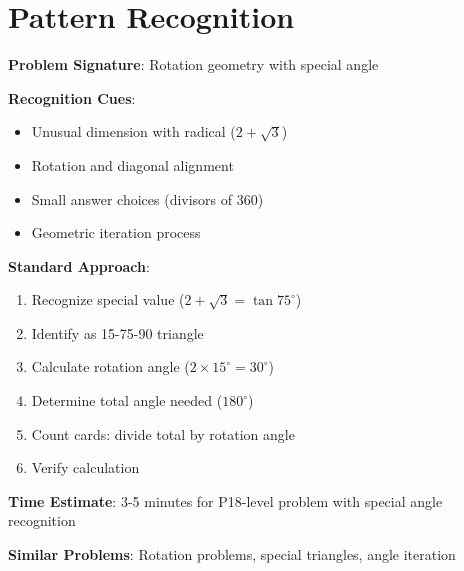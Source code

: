 \documentclass[12pt]{article}
\begin{document}
\section*{Pattern Recognition}

\textbf{Problem Signature}: Rotation geometry with special angle

\textbf{Recognition Cues}:
\begin{itemize}
    \item Unusual dimension with radical ($2+\sqrt{3}$)
    \item Rotation and diagonal alignment
    \item Small answer choices (divisors of 360)
    \item Geometric iteration process
\end{itemize}

\textbf{Standard Approach}:
\begin{enumerate}
    \item Recognize special value ($2+\sqrt{3} = \tan 75^\circ$)
    \item Identify as 15-75-90 triangle
    \item Calculate rotation angle ($2 \times 15^\circ = 30^\circ$)
    \item Determine total angle needed ($180^\circ$)
    \item Count cards: divide total by rotation angle
    \item Verify calculation
\end{enumerate}

\textbf{Time Estimate}: 3-5 minutes for P18-level problem with special angle recognition

\textbf{Similar Problems}: Rotation problems, special triangles, angle iteration
\end{document}

